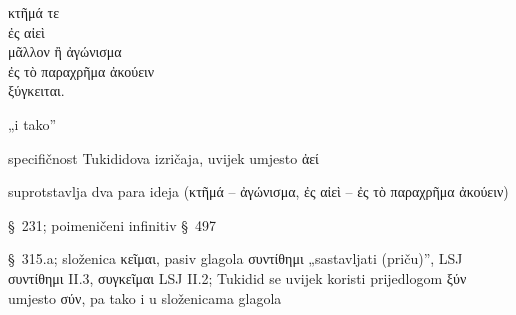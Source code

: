 {\large
\begin{greek}
\noindent κτῆμά τε \\
\tabto{2em} ἐς αἰεὶ \\
μᾶλλον ἢ ἀγώνισμα \\
\tabto{2em} ἐς τὸ παραχρῆμα ἀκούειν \\
ξύγκειται.\\

\end{greek}
}

\begin{description}[noitemsep]
\item[τε] „i tako”
\item[αἰεὶ] specifičnost Tukididova izričaja, uvijek umjesto ἀεί
\item[μᾶλλον ἢ] suprotstavlja dva para ideja \textgreek[variant=ancient]{(κτῆμά – ἀγώνισμα, ἐς αἰεὶ – ἐς τὸ παραχρῆμα ἀκούειν)}
\item[ἀκούειν] §~231; poimeničeni infinitiv §~497
\item[ξύγκειται] §~315.a; složenica κεῖμαι, pasiv glagola συντίθημι „sastavljati (priču)”, LSJ συντίθημι II.3, συγκεῖμαι LSJ II.2; Tukidid se uvijek koristi prijedlogom ξύν umjesto σύν, pa tako i u složenicama glagola

\end{description}



